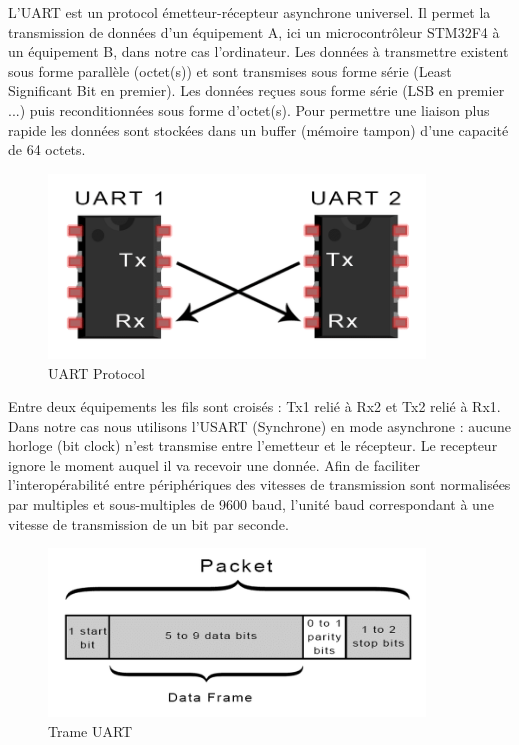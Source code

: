 \documentclass[11pt, french]{article}
\begin{document}
L'UART est un protocol émetteur-récepteur asynchrone universel. Il permet la transmission de données d'un équipement A, ici un microcontrôleur STM32F4 à un équipement B, dans notre cas l'ordinateur. Les données à transmettre existent sous forme parallèle (octet(s)) et sont transmises sous forme série (Least Significant Bit en premier). Les données reçues sous forme série (LSB en premier ...) puis reconditionnées sous forme d'octet(s). Pour permettre une liaison plus rapide les données sont stockées dans un buffer (mémoire tampon) d'une capacité de 64 octets. 

\vspace*{0.1cm}
\begin{figure}[htb]
\centering
\includegraphics[width=10cm]{uart.png}
\caption{UART Protocol}
\label{fig:uartprotocol}
\end{figure}
\vspace*{0.1cm}

Entre deux équipements les fils sont croisés : Tx1 relié à Rx2 et Tx2 relié à Rx1. Dans notre cas nous utilisons l'USART (Synchrone) en mode asynchrone : aucune horloge (bit clock) n'est transmise entre l'emetteur et le récepteur. Le recepteur ignore le moment auquel il va recevoir une donnée. Afin de faciliter l'interopérabilité entre périphériques  des vitesses de transmission sont normalisées par multiples et sous-multiples de 9600 baud, l'unité baud correspondant à une vitesse de transmission de un bit par seconde.

\vspace*{0.1cm}
\begin{figure}[htb]
\centering
\includegraphics[width=10cm]{uartframe.png}
\caption{Trame UART}
\label{fig:uartframe}
\end{figure}
\vspace*{0.1cm}
\end{document}
